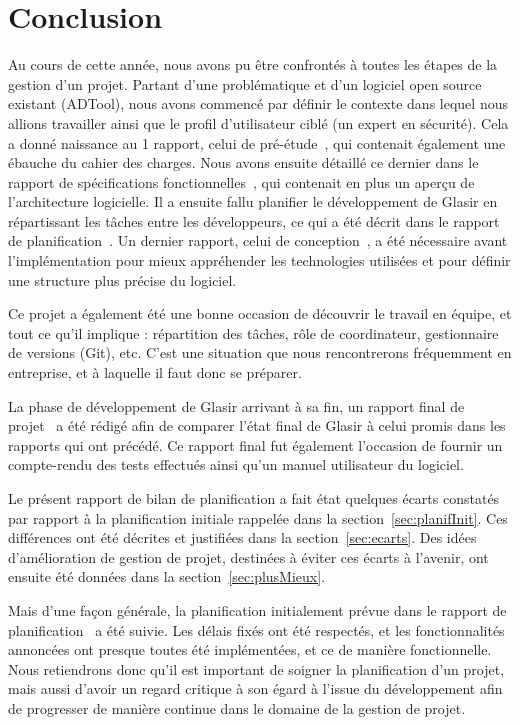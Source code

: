 \section{Conclusion}
\label{sec:conclu}

Au cours de cette année, nous avons pu être confrontés à toutes les étapes de la gestion d'un projet. Partant d'une problématique et d'un logiciel open source existant (ADTool), nous avons commencé par définir le contexte dans lequel nous allions travailler ainsi que le profil d'utilisateur ciblé (un expert en sécurité). Cela a donné naissance au 1\ier{} rapport, celui de pré-étude~\cite{pre_etude}, qui contenait également une ébauche du cahier des charges. Nous avons ensuite détaillé ce dernier dans le rapport de spécifications fonctionnelles~\cite{spec_fonc}, qui contenait en plus un aperçu de l'architecture logicielle. Il a ensuite fallu planifier le développement de Glasir en répartissant les tâches entre les développeurs, ce qui a été décrit dans le rapport de planification~\cite{planif}. Un dernier rapport, celui de conception~\cite{conception}, a été nécessaire avant l'implémentation pour mieux appréhender les technologies utilisées et pour définir une structure plus précise du logiciel.

Ce projet a également été une bonne occasion de découvrir le travail en équipe, et tout ce qu'il implique : répartition des tâches, rôle de coordinateur, gestionnaire de versions (Git), etc. C'est une situation que nous rencontrerons fréquemment en entreprise, et à laquelle il faut donc se préparer.

La phase de développement de Glasir arrivant à sa fin, un rapport final de projet~\cite{rapportFinal} a été rédigé afin de comparer l'état final de Glasir à celui promis dans les rapports qui ont précédé. Ce rapport final fut également l'occasion de fournir un compte-rendu des tests effectués ainsi qu'un manuel utilisateur du logiciel.

Le présent rapport de bilan de planification a fait état quelques écarts constatés par rapport à la planification initiale rappelée dans la {\sc section}~\ref{sec:planifInit}. Ces différences ont été décrites et justifiées dans la {\sc section}~\ref{sec:ecarts}. Des idées d'amélioration de gestion de projet, destinées à éviter ces écarts à l'avenir, ont ensuite été données dans la {\sc section}~\ref{sec:plusMieux}.

Mais d'une façon générale, la planification initialement prévue dans le rapport de planification~\cite{planif} a été suivie. Les délais fixés ont été respectés, et les fonctionnalités annoncées ont presque toutes été implémentées, et ce de manière fonctionnelle. Nous retiendrons donc qu'il est important de soigner la planification d'un projet, mais aussi d'avoir un regard critique à son égard à l'issue du développement afin de progresser de manière continue dans le domaine de la gestion de projet.